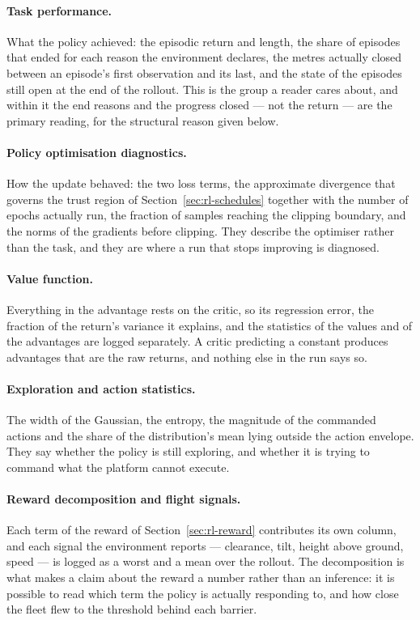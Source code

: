 \paragraph{Task performance.}
What the policy achieved: the episodic return and length, the share of episodes
that ended for each reason the environment declares, the metres actually closed
between an episode's first observation and its last, and the state of the
episodes still open at the end of the rollout. This is the group a reader cares
about, and within it the end reasons and the progress closed --- not the return
--- are the primary reading, for the structural reason given below.

\paragraph{Policy optimisation diagnostics.}
How the update behaved: the two loss terms, the approximate divergence that
governs the trust region of Section~\ref{sec:rl-schedules} together with the
number of epochs actually run, the fraction of samples reaching the clipping
boundary, and the norms of the gradients before clipping. They describe the
optimiser rather than the task, and they are where a run that stops improving is
diagnosed.

\paragraph{Value function.}
Everything in the advantage rests on the critic, so its regression error, the
fraction of the return's variance it explains, and the statistics of the values
and of the advantages are logged separately. A critic predicting a constant
produces advantages that are the raw returns, and nothing else in the run says
so.

\paragraph{Exploration and action statistics.}
The width of the Gaussian, the entropy, the magnitude of the commanded actions
and the share of the distribution's mean lying outside the action envelope. They
say whether the policy is still exploring, and whether it is trying to command
what the platform cannot execute.

\paragraph{Reward decomposition and flight signals.}
Each term of the reward of Section~\ref{sec:rl-reward} contributes its own
column, and each signal the environment reports --- clearance, tilt, height
above ground, speed --- is logged as a worst and a mean over the rollout. The
decomposition is what makes a claim about the reward a number rather than an
inference: it is possible to read which term the policy is actually responding
to, and how close the fleet flew to the threshold behind each barrier.

